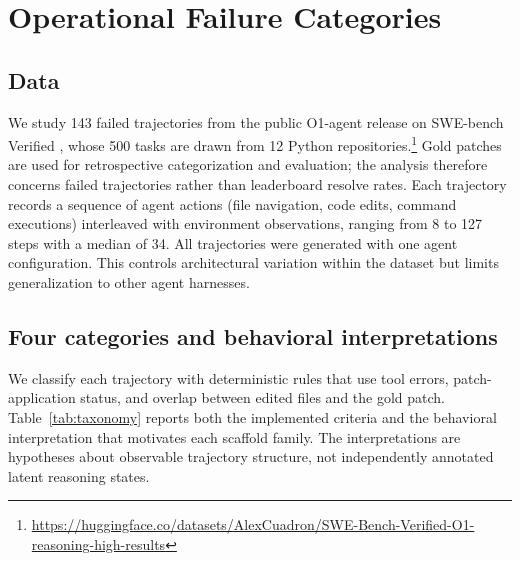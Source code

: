 \documentclass{article}
\begin{document}
\section{Operational Failure Categories}
\label{sec:taxonomy}

\subsection{Data}

We study 143 failed trajectories from the public O1-agent release on
SWE-bench Verified \citep{jimenez2024swebench}, whose 500 tasks are drawn from
12 Python repositories.\footnote{\url{https://huggingface.co/datasets/AlexCuadron/SWE-Bench-Verified-O1-reasoning-high-results}}
Gold patches are used for retrospective categorization and evaluation; the
analysis therefore concerns failed trajectories rather than leaderboard resolve
rates.
Each trajectory records a sequence of agent actions (file navigation, code edits, command executions) interleaved with environment observations, ranging from 8 to 127 steps with a median of 34.
All trajectories were generated with one agent configuration.  This controls
architectural variation within the dataset but limits generalization to other
agent harnesses.

\subsection{Four categories and behavioral interpretations}

We classify each trajectory with deterministic rules that use tool errors,
patch-application status, and overlap between edited files and the gold patch.
Table~\ref{tab:taxonomy} reports both the implemented criteria and the
behavioral interpretation that motivates each scaffold family.  The
interpretations are hypotheses about observable trajectory structure, not
independently annotated latent reasoning states.
\end{document}
